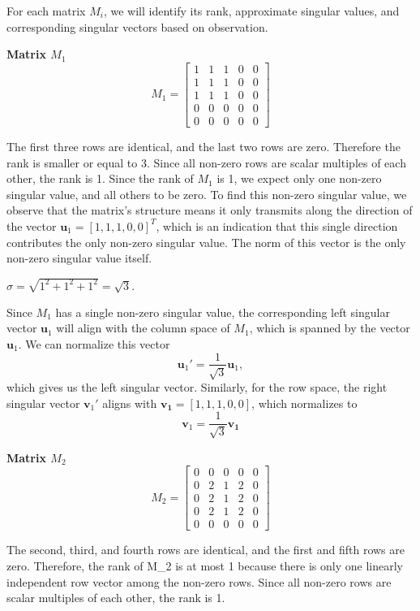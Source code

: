 \documentclass[a4paper,oneside,bibliography=totoc]{scrartcl}
\begin{document}
For each matrix \( M_i \), we will identify its rank, approximate singular values, and corresponding singular vectors based on observation.

\textbf{Matrix \( M_1 \)}
\[
M_1 = \begin{bmatrix} 1 & 1 & 1 & 0 & 0 \\ 1 & 1 & 1 & 0 & 0 \\ 1 & 1 & 1 & 0 & 0 \\ 0 & 0 & 0 & 0 & 0 \\ 0 & 0 & 0 & 0 & 0 \end{bmatrix}
\]

The first three rows are identical, and the last two rows are zero. Therefore the rank is smaller or equal to 3. Since all non-zero rows are scalar multiples of each other, the rank is 1.
Since the rank of $M_1$ is 1, we expect only one non-zero singular value, and all others to be zero. To find this non-zero singular value, we observe that the matrix’s structure means it only transmits along the direction of the vector $\mathbf{u}_1 = [1, 1, 1, 0, 0]^T$, which is an indication that this single direction contributes the only non-zero singular value. The norm of this vector is the only non-zero singular value itself.

$\sigma = \sqrt{1^2 + 1^2 + 1^2} = \sqrt{3}.$

Since  $M_1$  has a single non-zero singular value, the corresponding left singular vector  $\mathbf{u}_1$  will align with the column space of  $M_1$, which is spanned by the vector $\mathbf{u}_1$. We can normalize this vector
\[
\mathbf{u}_1' = \frac{1}{\sqrt{3}} \mathbf{u}_1, 
\]
which gives us the left singular vector. Similarly, for the row space, the right singular vector  $\mathbf{v}_1'$  aligns with $\mathbf{v_1} = [1, 1, 1, 0, 0]$, which normalizes to
\[
\mathbf{v}_1 = \frac{1}{\sqrt{3}} \mathbf{v_1}
\]

\textbf{Matrix \( M_2 \)}
\[
M_2 = \begin{bmatrix} 0 & 0 & 0 & 0 & 0 \\ 0 & 2 & 1 & 2 & 0 \\ 0 & 2 & 1 & 2 & 0 \\ 0 & 2 & 1 & 2 & 0 \\ 0 & 0 & 0 & 0 & 0 \end{bmatrix}
\]

The second, third, and fourth rows are identical, and the first and fifth rows are zero. Therefore, the rank of  M_2  is at most 1 because there is only one linearly independent row vector among the non-zero rows. Since all non-zero rows are scalar multiples of each other, the rank is 1.
\end{document}
